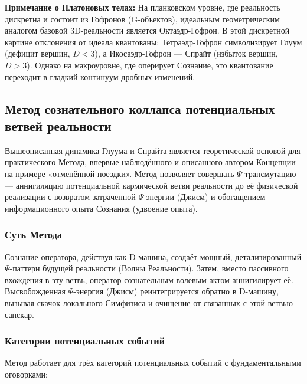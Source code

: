 \documentclass[a4paper,12pt]{article}
\begin{document}
\textbf{Примечание о Платоновых телах:} На планковском уровне, где реальность дискретна и состоит из Гофронов (G-объектов), идеальным геометрическим аналогом базовой 3D-реальности является Октаэдр-Гофрон. В этой дискретной картине отклонения от идеала квантованы: Тетраэдр-Гофрон символизирует Глуум (дефицит вершин, $D < 3$), а Икосаэдр-Гофрон — Спрайт (избыток вершин, $D > 3$). Однако на макроуровне, где оперирует Сознание, это квантование переходит в гладкий континуум дробных изменений.

\subsection{Метод сознательного коллапса потенциальных ветвей реальности}

Вышеописанная динамика Глуума и Спрайта является теоретической основой для практического Метода, впервые наблюдённого и описанного автором Концепции на примере «отменённой поездки». Метод позволяет совершать $\Psi$-трансмутацию — аннигиляцию потенциальной кармической ветви реальности до её физической реализации с возвратом затраченной $\Psi$-энергии (Джисм) и обогащением информационного опыта Сознания (удвоение опыта).

\subsubsection{Суть Метода}

Сознание оператора, действуя как D-машина, создаёт мощный, детализированный $\Psi$-паттерн будущей реальности (Волны Реальности). Затем, вместо пассивного вхождения в эту ветвь, оператор сознательным волевым актом аннигилирует её. Высвобожденная $\Psi$-энергия (Джисм) реинтегрируется обратно в D-машину, вызывая скачок локального Симфизиса и очищение от связанных с этой ветвью санскар.

\subsubsection{Категории потенциальных событий}

Метод работает для трёх категорий потенциальных событий с фундаментальными оговорками:
\end{document}
